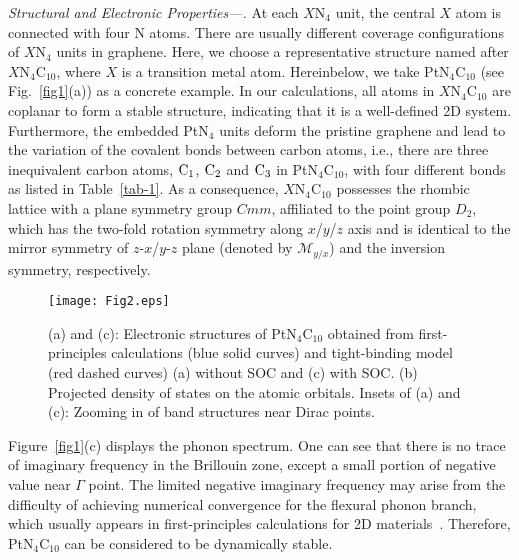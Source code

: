 \documentclass[aps,prl,twocolumn,showpacs,superscriptaddress]{revtex4-1}
\begin{document}
\textit{Structural and Electronic Properties---.} At each $X$N$_4$ unit, the central $X$ atom is connected with four N atoms. There are usually different coverage configurations of $X$N$_4$ units in graphene. Here, we choose a representative structure named after $X$N$_4$C$_{10}$, where $X$ is a transition metal atom. Hereinbelow, we take PtN$_4$C$_{10}$ (see Fig.~\ref{fig1}(a)) as a concrete example. In our calculations, all atoms in $X$N$_4$C$_{10}$ are coplanar to form a stable structure, indicating that it is a well-defined 2D system. Furthermore, the embedded PtN$_4$ units deform the pristine graphene and lead to the variation of the covalent bonds between carbon atoms, i.e., there are three inequivalent carbon atoms, ${\rm C_1}$, ${\rm C_2}$ and ${\rm C_3}$ in PtN$_4$C$_{10}$, with four different bonds as listed in Table~\ref{tab-1}. As a consequence, $X$N$_4$C$_{10}$ possesses the rhombic lattice with a plane symmetry group $Cmm$, affiliated to the point group $D_{2}$, which has the two-fold rotation symmetry along $x$/$y$/$z$ axis and is identical to the mirror symmetry of $z$-$x$/$y$-$z$ plane (denoted by $\mathcal{M}_{y/x}$) and the inversion symmetry, respectively.

\begin{figure*}
  \centering
  \texttt{[image: Fig2.eps]}
  \caption{(a) and (c): Electronic structures of PtN$_4$C$_{10}$ obtained from first-principles calculations (blue solid curves) and tight-binding model (red dashed curves) (a) without SOC and (c) with SOC. (b) Projected density of states on the atomic orbitals. Insets of (a) and (c): Zooming in of band structures near Dirac points.}
	\label{fig2*}
\end{figure*}

Figure~\ref{fig1}(c) displays the phonon spectrum. One can see that there is no trace of imaginary frequency in the Brillouin zone, except a small portion of negative value near $\Gamma$ point. The limited negative imaginary frequency may arise from the difficulty of achieving numerical convergence for the flexural phonon branch, which usually appears in first-principles calculations for 2D materials~\cite {ref57,ref58}. Therefore, PtN$_4$C$_{10}$ can be considered to be dynamically stable.
\end{document}

